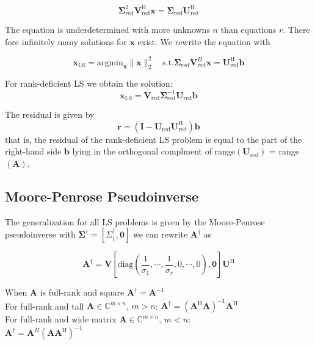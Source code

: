 \documentclass[english]{latex4ei/latex4ei_sheet}
\begin{document}
\begin{sectionbox}
    $$\mathbf{\Sigma}^2_{\text{red}}\mathbf{V}^\text{H}_{\text{red}}\mathbf{x} = \mathbf{\Sigma}_{\text{red}}\mathbf{U}^\text{H}_{\text{red}}$$

    The equation is underdetermined with more unknowns $n$ than equations $r$. There fore infinitely many solutions for $\mathbf{x}$ exist. We rewrite the equation with

    $$\mathbf{x}_{\text{LS}} =\text{argmin}_\mathbf{x} \parallel \mathbf{x}\parallel^2_2 \quad \text{s.t.} \mathbf{\Sigma}_{\text{red}}\mathbf{V}^H_{\text{red}}\mathbf{x} = \mathbf{U}^\text{H}_{\text{red}}\mathbf{b}$$

    For rank-deficient LS we obtain the solution:
    $$\mathbf{x}_{\text{LS}}=\mathbf{V}_{\text{red}}\mathbf{\Sigma}^{-1}_{\text{red}}\mathbf{U}_{\text{red}}\mathbf{b}$$

    The residual is given by $$\mathbf{r} = (\mathbf{I} - \mathbf{U}_{\text{red}}\mathbf{U}_{\text{red}}^\text{H})\mathbf{b}$$
    that is, the residual of the rank-deficient LS problem is equal to the part of the right-hand side $\mathbf{b}$ lying in the orthogonal complment of range$(\mathbf{U}_{\text{red}})$ = range$(\mathbf{A})$.
\end{sectionbox}
\begin{sectionbox}
    \subsection{Moore-Penrose Pseudoinverse}
    The generalization for all LS problems is given by the Moore-Penrose pseudoinverse with $\mathbf{\Sigma}^\dagger = [\Sigma^\dagger_1, \mathbf{0}]$ we can rewrite $\mathbf{A}^\dagger$ as

    $$\mathbf{A}^\dagger = \mathbf{V}[\text{diag}(\frac{1}{\sigma_1}, \cdots, \frac{1}{\sigma_r}, 0, \cdots,0),\mathbf{0}]\mathbf{U}^\text{H}$$

    When $\mathbf{A}$ is full-rank and square $\mathbf{A}^\dagger = \mathbf{A}^{-1}$\\
    For full-rank and tall $\mathbf{A}\in\mathbb{C}^{m\times n}$, $m > n$: $\mathbf{A}^\dagger = (\mathbf{A}^\text{H}\mathbf{A})^{-1}\mathbf{A}^\text{H}$\\
    For full-rank and wide matrix $\mathbf{A} \in\mathbb{C}^{m\times n}$, $m < n$:\\
    $\mathbf{A}^\dagger = \mathbf{A}^H(\mathbf{A}\mathbf{A}^\text{H})^{-1}$
\end{sectionbox}
\end{document}
